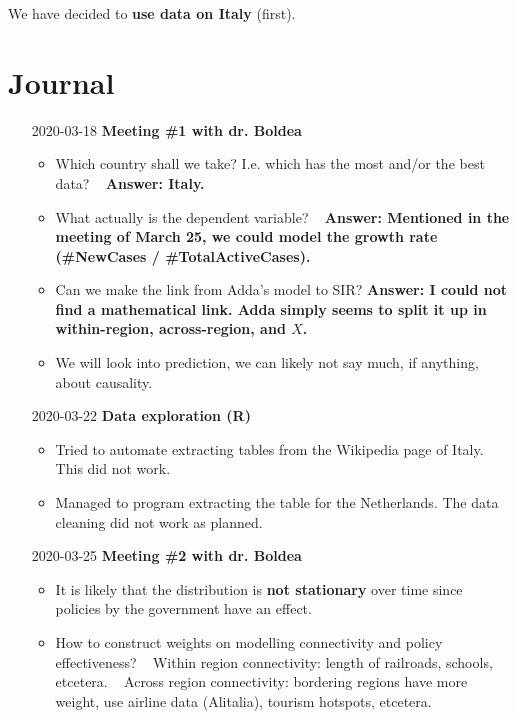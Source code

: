 \documentclass{article}
\begin{document}
We have decided to \textbf{use data on Italy} (first).

\section{Journal}
\begin{itemize}
	\item[2020-03-18]
	\textbf{Meeting \#1 with dr. Boldea}
		\begin{itemize}
			\item Which country shall we take? I.e. which has the most and/or the best data?
				\subitem \textbullet~ \textbf{Answer: Italy.}
			\item What actually is the dependent variable?
				\subitem \textbullet~ \textbf{Answer: Mentioned in the meeting of March 25, we could model the growth rate (\#NewCases / \#TotalActiveCases).}
			\item Can we make the link from Adda's model to SIR?
				\subitem \textbf{Answer: I could not find a mathematical link. Adda simply seems to split it up in within-region, across-region, and $X$.}
			\item We will look into prediction, we can likely not say much, if anything, about causality.
		\end{itemize}
	
	\item[2020-03-22]
	\textbf{Data exploration (R)}
		\begin{itemize}
			\item Tried to automate extracting tables from the Wikipedia page of Italy. This did not work.
			\item Managed to program extracting the table for the Netherlands. The data cleaning did not work as planned.
		\end{itemize}
	
	\item[2020-03-25]
	\textbf{Meeting \#2 with dr. Boldea}
		\begin{itemize}
			\item It is likely that the distribution is \textbf{not stationary} over time since policies by the government have an effect.
			\item How to construct weights on modelling connectivity and policy effectiveness?
				\subitem \textbullet~ Within region connectivity: length of railroads, schools, etcetera.
				\subitem \textbullet~ Across region connectivity: bordering regions have more weight, use airline data (Alitalia), tourism hotspots, etcetera.
				

\end{itemize}
\end{itemize}
\end{document}
